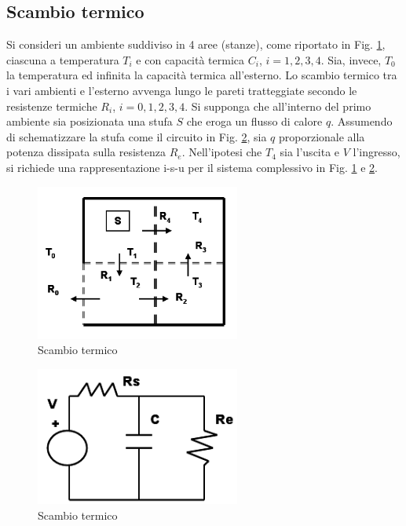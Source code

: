 \documentclass[a4paper]{report}
\begin{document}
\subsection{Scambio termico}
Si consideri un ambiente suddiviso in 4 aree (stanze), come riportato
in Fig. \ref{fig:esempio06}, ciascuna a temperatura $T_i$ e con
capacit\`a termica $C_i$, $i=1,2,3,4$. Sia, invece, $T_0$ la
temperatura ed infinita la capacit\`a termica all'esterno. Lo scambio
termico tra i vari ambienti e l'esterno avvenga lungo le pareti
tratteggiate secondo le resistenze termiche $R_i$, $i=0,1,2,3,4$. Si
supponga che all'interno del primo ambiente sia posizionata una stufa
$S$ che eroga un flusso di calore $q$. Assumendo di schematizzare la
stufa come il circuito in Fig. \ref{fig:esempio06-2}, sia $q$
proporzionale alla potenza dissipata sulla resistenza $R_e$.
Nell'ipotesi che $T_4$ sia l'uscita e $V$ l'ingresso, si richiede una
rappresentazione i-s-u per il sistema complessivo in
Fig. \ref{fig:esempio06} e \ref{fig:esempio06-2}.
\begin{figure}[!t]
  \centering
  \includegraphics[width=0.6\textwidth]{./images/esempio06.png}
  \caption{Scambio termico\label{fig:esempio06}}
\end{figure}
\begin{figure}[!t]
  \centering
  \includegraphics[width=0.6\textwidth]{./images/esempio06-2.png}
  \caption{Scambio termico\label{fig:esempio06-2}}
\end{figure}
\end{document}
